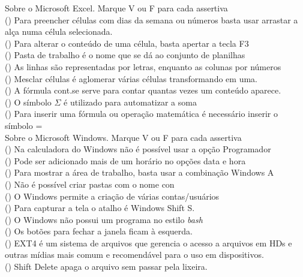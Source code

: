 \documentclass[12pt]{exam}
\begin{document}
\begin{questions}
\question Sobre o Microsoft Excel. Marque V ou F para cada assertiva \\
(\hspace{6px}) Para preencher células com dias da semana ou números basta usar arrastar a alça numa célula selecionada.\\
(\hspace{6px}) Para alterar o conteúdo de uma célula, basta apertar a tecla F3\\
(\hspace{6px}) Pasta de trabalho é o nome que se dá ao conjunto de planilhas \\
(\hspace{6px}) As linhas são representadas por letras, enquanto as colunas por números\\
(\hspace{6px}) Mesclar células é aglomerar várias células transformando em uma.\\
(\hspace{6px}) A fórmula cont.se serve para contar quantas vezes um conteúdo aparece.\\
(\hspace{6px}) O símbolo $\Sigma $ é utilizado para automatizar a soma\\
(\hspace{6px}) Para inserir uma fórmula ou operação matemática é necessário inserir o símbolo = \\

\question Sobre o Microsoft Windows. Marque V ou F para cada assertiva \\
(\hspace{6px}) Na calculadora do Windows não é possível usar a opção Programador\\
(\hspace{6px}) Pode ser adicionado mais de um horário no opções data e hora\\
(\hspace{6px}) Para mostrar a área de trabalho, basta usar a combinação Windows A \\
(\hspace{6px}) Não é possível criar pastas com o nome con\\
(\hspace{6px}) O Windows permite a criação de várias contas/usuários\\
(\hspace{6px}) Para capturar a tela o atalho é Windows Shift S.\\
(\hspace{6px}) O Windows não possui um programa no estilo \textit{bash}\\
(\hspace{6px}) Os botões para fechar a janela ficam à esquerda.\\
(\hspace{6px}) EXT4 é um sistema de arquivos que gerencia o acesso a arquivos em HDs e outras mídias mais comum e recomendável para o uso em dispositivos.  \\
(\hspace{6px}) Shift Delete apaga o arquivo sem passar pela lixeira.

\end{questions}
%
%
%
%
%
%
%
\end{document}
